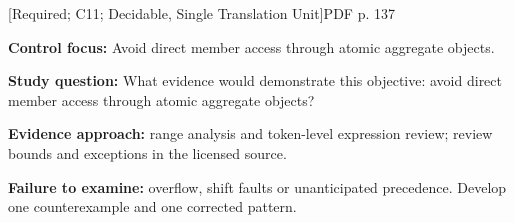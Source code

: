\documentclass[10pt,letterpaper]{article}
\begin{document}
\smallskip
{}
 \textsf{\footnotesize [Required; C11; Decidable, Single Translation Unit]}\hfill{\footnotesize PDF p. 137}\par
\textbf{Control focus:} Avoid direct member access through atomic aggregate objects.\par
\textbf{Study question:} What evidence would demonstrate this objective: avoid direct member access through atomic aggregate objects?\par
\textbf{Evidence approach:} range analysis and token-level expression review; review bounds and exceptions in the licensed source.\par
\textbf{Failure to examine:} overflow, shift faults or unanticipated precedence. Develop one counterexample and one corrected pattern.\par
\smallskip
\end{document}
